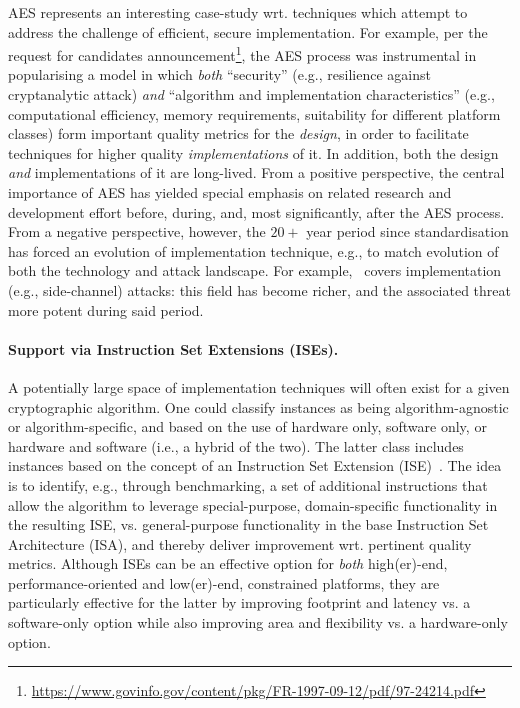 AES represents an interesting case-study wrt. techniques which attempt to 
address the challenge of efficient, secure implementation.  For example,
per the request for candidates announcement\footnote{%
\url{https://www.govinfo.gov/content/pkg/FR-1997-09-12/pdf/97-24214.pdf}
}, the AES process was instrumental in popularising a model in which
{\em both}
``security''
(e.g., resilience against cryptanalytic attack)
{\em and}
``algorithm and implementation characteristics''
(e.g., computational efficiency, memory requirements, suitability for different platform classes)
form important quality metrics for the {\em design}, in order to facilitate
techniques for higher quality {\em implementations} of it.
In addition,
both the design {\em and} implementations of it are long-lived.
From a positive perspective, 
the central importance of AES has yielded special emphasis on related
research and development effort before, during, and, most significantly, 
after the AES process.
From a negative perspective, however,
the $20+$ year period since standardisation has forced an evolution of 
implementation technique, e.g., to match evolution of both the technology 
and attack landscape.  For example,~\cite[Section 3.6]{NBBBDFR:01} covers
implementation (e.g., side-channel) attacks: this field has become richer,
and the associated threat more potent during said period.


\paragraph{Support via Instruction Set Extensions (ISEs).}

A potentially large space of implementation techniques will often exist
for a given cryptographic algorithm.  One could classify instances as being 
   algorithm-agnostic
   or
   algorithm-specific,
and based on the use of   
   hardware              only,
                software only,
   or
   hardware and software (i.e., a hybrid of the two).
The latter class includes instances based on the concept of an
Instruction Set Extension (ISE)~\cite{GalBer:11,BarGioMar:09,RegIen:16}.
The idea is to identify, e.g., through benchmarking, a set of additional 
instructions that allow the algorithm to leverage
special-purpose, domain-specific functionality
in the resulting ISE,
vs. 
general-purpose                  functionality
in the base Instruction Set Architecture (ISA),
and thereby deliver improvement wrt. pertinent quality metrics.  
Although ISEs can be an effective option for {\em both}
high(er)-end, performance-oriented
and
 low(er)-end, constrained
platforms, 
they are particularly effective for the latter by 
improving footprint and latency
vs. a software-only option
while also
improving area      and flexibility
vs. a hardware-only option.

